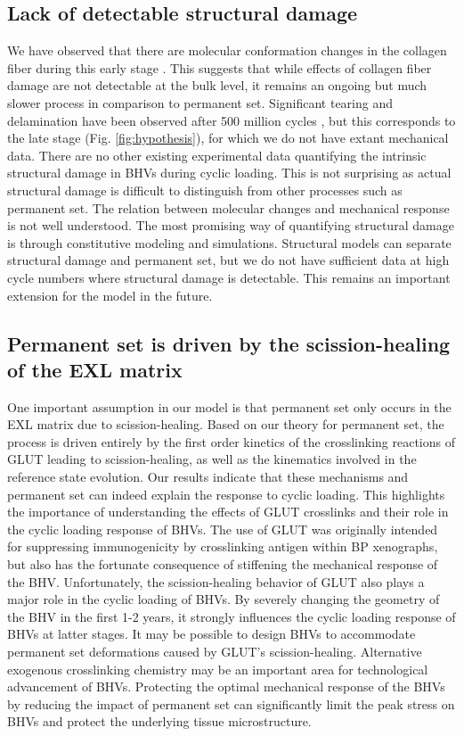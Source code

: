 \subsection{Lack of detectable structural damage}
	We have observed that there are molecular conformation changes in the collagen fiber during this early stage \cite{sun_response_2004, sellaro_effects_2007}. 	This suggests that while effects of collagen fiber damage are not detectable at the bulk level, it remains an ongoing but much slower process in comparison to permanent set. 
	Significant tearing and delamination have been observed after 500 million cycles \cite{sacks_effects_1998}, but this corresponds to the late stage (Fig. \ref{fig:hypothesis}), for which we do not have extant mechanical data. 
	There are no other existing experimental data quantifying the intrinsic structural damage in BHVs during cyclic loading. 
	This is not surprising as actual structural damage is difficult to distinguish from other processes such as permanent set. 
	The relation between molecular changes and mechanical response is not well understood.
	The most promising way of quantifying structural damage is through constitutive modeling and simulations. 
	Structural models can separate structural damage and permanent set, but we do not have sufficient data at high cycle numbers where structural damage is detectable. This remains an important extension for the model in the future. 

\subsection{Permanent set is driven by the scission-healing of the EXL matrix}
	One important assumption in our model is that permanent set only occurs in the EXL matrix due to scission-healing. 
	Based on our theory for permanent set, the process is driven entirely by the first order kinetics of the crosslinking reactions of GLUT leading to scission-healing, as well as the kinematics involved in the reference state evolution. 
	Our results indicate that these mechanisms and permanent set can indeed explain the response to cyclic loading.
	This highlights the importance of understanding the effects of GLUT crosslinks and their role in the cyclic loading response of BHVs. 
	The use of GLUT was originally intended for suppressing immunogenicity by crosslinking antigen within BP xenographs, but also has the fortunate consequence of stiffening the mechanical response of the BHV. 
	Unfortunately, the scission-healing behavior of GLUT also plays a major role in the cyclic loading of BHVs. 
	By severely changing the geometry of the BHV in the first 1-2 years, it strongly influences the cyclic loading response of BHVs at latter stages. 
	It may be possible to design BHVs to accommodate permanent set deformations caused by GLUT's scission-healing. 
	Alternative exogenous crosslinking chemistry \cite{tam_fixation_2017, tam_novel_2015} may be an important area for technological advancement of BHVs. 
	Protecting the optimal mechanical response of the BHVs by reducing the impact of permanent set can significantly limit the peak stress on BHVs and protect the underlying tissue microstructure. 

